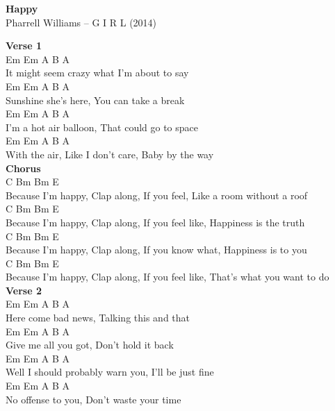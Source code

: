 \documentclass[a4paper]{article}
\begin{document}
    \begin{center}
        \textbf{Happy}
        ~\\
        Pharrell Williams -- G I R L (2014)
    \end{center}
    {
        \scriptsize
        \textbf{Verse 1}
        ~\\
        {
            \cutive
            \obeyspaces
 Em                                          Em  A  B    A
\\
    It might seem crazy what I'm about to say
\\
 Em                                          Em  A  B    A
\\
    Sunshine she's here,  You can take a break
\\
          Em                                    Em  A  B    A
\\
    I'm a hot air balloon, That could go to space
\\
             Em                                     Em  A  B    A
\\
    With the air, Like I don't care,  Baby by the way
\\

        }
        \textbf{Chorus}
        ~\\
        {
            \cutive
            \obeyspaces
                C                Bm                   Bm             E
\\
  Because I'm happy, Clap along, If you feel, Like a room without a roof
\\
                C                Bm                   Bm              E
\\
  Because I'm happy, Clap along, If you feel like, Happiness is the truth
\\
                C                Bm                   Bm            E
\\
  Because I'm happy, Clap along, If you know what, Happiness is to you
\\
                C                Bm                 Bm                     E
\\
  Because I'm happy, Clap along, If you feel like, That's what you want to do
\\

        }
        \textbf{Verse 2}
        ~\\
        {
            \cutive
            \obeyspaces
 Em                                         Em A B    A
\\
    Here come bad news, Talking this and that
\\
 Em                                         Em A B    A
\\
    Give me all you got,  Don't hold it back
\\
 Em                                                  Em A  B   A
\\
    Well I should probably warn you,  I'll be just fine
\\
 Em                                          Em  A  B    A
\\
    No offense to you,  Don't waste your time
\\

}}
\end{document}
